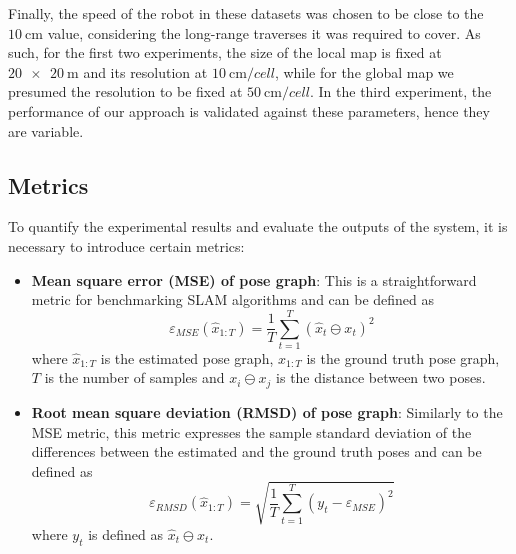 Finally, the speed of the robot in these datasets was chosen to be close
to the $\SI{10}{\cm}$ value, considering the long-range traverses it was
required to cover.
As such, for the first two experiments, the size of the local map is fixed at
$\SI{20 x 20}{\m}$ and its resolution at $\SI{10}{\cm \per cell}$,
while for the global map we presumed the resolution to be fixed at
$\SI{50}{\cm \per cell}$.
In the third experiment, the performance of our approach is validated against
these parameters, hence they are variable.


\subsection{Metrics} \label{metrics}

To quantify the experimental results and evaluate the outputs of the system,
it is necessary to introduce certain metrics:
\begin{itemize}
    \item \textbf{Mean square error (MSE) of pose graph}:
        This is a straightforward metric for benchmarking SLAM algorithms
        and can be defined as
        \begin{equation}
            \varepsilon_{MSE} (\hat{x}_{1:T}) = \frac{1}{T}
            \sum\limits_{t=1}^T (\hat{x}_t \ominus x_t)^2
        \end{equation}
        where
        $\hat{x}_{1:T}$ is the estimated pose graph,
        $x_{1:T}$ is the ground truth pose graph,
        $T$ is the number of samples and
        $x_i \ominus x_j$ is the distance between two poses.


    \item \textbf{Root mean square deviation (RMSD) of pose graph}:
        Similarly to the MSE metric, this metric expresses the sample
        standard deviation of the differences between the estimated and the
        ground truth poses and can be defined as
        \begin{equation}
            \varepsilon_{RMSD} (\hat{x}_{1:T}) = \sqrt{\frac{1}{T}
            \sum\limits_{t=1}^T (y_t - \varepsilon_{MSE})^2}
        \end{equation}
        where $y_t$ is defined as $\hat{x}_t \ominus x_t$.

\end{itemize}

